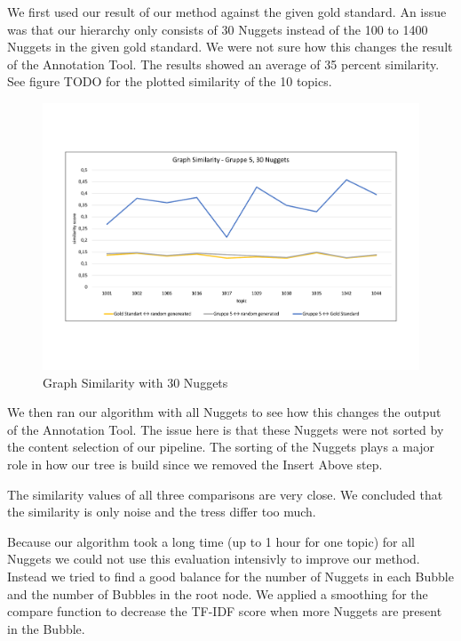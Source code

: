 We first used our result of our method against the given gold standard. An issue was that our hierarchy only consists of 30 Nuggets instead of the 100 to 1400 Nuggets in the given gold standard. We were not sure how this changes the result of the Annotation Tool. The results showed an average of 35 percent similarity. See figure TODO for the plotted similarity of the 10 topics.

\begin{figure}[H]
	\centering
	\includegraphics[trim= 0 120 0 120,width=\textwidth]{img/sim_v1.pdf}
	\caption{Graph Similarity with 30 Nuggets}
	\label{fig:spc}
\end{figure}

We then ran our algorithm with all Nuggets to see how this changes the output of the Annotation Tool. The issue here is that these Nuggets were not sorted by the content selection of our pipeline. The sorting of the Nuggets plays a major role in how our tree is build since we removed the Insert Above step.

The similarity values of all three comparisons are very close. We concluded that the similarity is only noise and the tress differ too much.

Because our algorithm took a long time (up to 1 hour for one topic) for all Nuggets we could not use this evaluation intensivly to improve our method. Instead we tried to find a good balance for the number of Nuggets in each Bubble and the number of Bubbles in the root node. We applied a smoothing for the compare function to decrease the TF-IDF score when more Nuggets are present in the Bubble.


